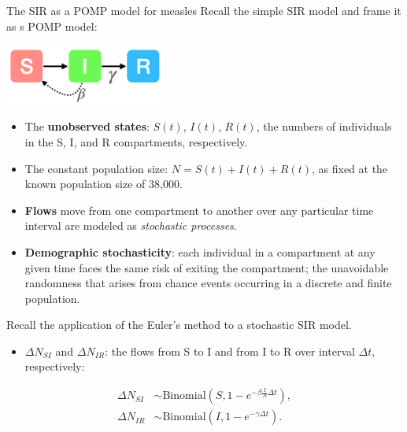\documentclass[
  ignorenonframetext,
  aspectratio=169,
  t]{beamer}
\providecommand{\tightlist}{%
  \setlength{\itemsep}{0pt}\setlength{\parskip}{0pt}}\usepackage{longtable,booktabs,array}
\theoremstyle{definition}
\begin{document}
\begin{frame}{The SIR as a POMP model for
measles}
\label{the-sir-as-a-pomp-model-for-measles}
Recall the simple SIR model and frame it as s POMP model:

\begin{center}
    \includegraphics[height=2cm]{../graphics/simple-sir.png}
\end{center}

\begin{itemize}
\item
  The \textbf{unobserved states}: \(S(t)\), \(I(t)\), \(R(t)\), the
  numbers of individuals in the S, I, and R compartments, respectively.
\item
  The constant population size: \(N=S(t)+I(t)+R(t)\), as fixed at the
  known population size of 38,000.
\item
  \textbf{Flows} move from one compartment to another over any
  particular time interval are modeled as \emph{stochastic processes}.
\item
  \textbf{Demographic stochasticity}: each individual in a compartment
  at any given time faces the same risk of exiting the compartment; the
  unavoidable randomness that arises from chance events occurring in a
  discrete and finite population.
\end{itemize}

\framebreak

Recall the application of the Euler's method to a stochastic SIR model.

\begin{itemize}
\tightlist
\item
  \(\Delta N_{SI}\) and \(\Delta N_{IR}\): the flows from S to I and
  from I to R over interval \(\Delta t\), respectively:
\end{itemize}

\[
\begin{aligned}
    \Delta N_{SI} &\sim \mathrm{Binomial}\left(S, 1-e^{-\beta\frac{I}{N}\Delta t}\right),\\
    \Delta N_{IR} &\sim \mathrm{Binomial}\left(I, 1-e^{-\gamma\Delta t}\right).
\end{aligned}
\]

\framebreak


\end{frame}
\end{document}
